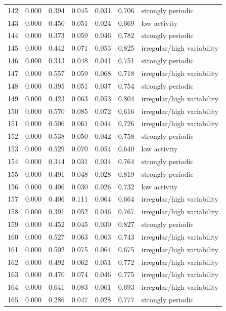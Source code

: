 \begin{longtable}{lrrrrrl}
142 & 0.000 & 0.394 & 0.045 & 0.031 & 0.706 & strongly periodic \\
143 & 0.000 & 0.450 & 0.051 & 0.024 & 0.669 & low activity \\
144 & 0.000 & 0.373 & 0.059 & 0.046 & 0.782 & strongly periodic \\
145 & 0.000 & 0.442 & 0.071 & 0.053 & 0.825 & irregular/high variability \\
146 & 0.000 & 0.313 & 0.048 & 0.041 & 0.751 & strongly periodic \\
147 & 0.000 & 0.557 & 0.059 & 0.068 & 0.718 & irregular/high variability \\
148 & 0.000 & 0.395 & 0.051 & 0.037 & 0.754 & strongly periodic \\
149 & 0.000 & 0.423 & 0.063 & 0.053 & 0.804 & irregular/high variability \\
150 & 0.000 & 0.570 & 0.085 & 0.072 & 0.616 & irregular/high variability \\
151 & 0.000 & 0.506 & 0.061 & 0.044 & 0.726 & irregular/high variability \\
152 & 0.000 & 0.538 & 0.050 & 0.042 & 0.758 & strongly periodic \\
153 & 0.000 & 0.529 & 0.070 & 0.054 & 0.640 & low activity \\
154 & 0.000 & 0.344 & 0.031 & 0.034 & 0.764 & strongly periodic \\
155 & 0.000 & 0.491 & 0.048 & 0.028 & 0.819 & strongly periodic \\
156 & 0.000 & 0.406 & 0.030 & 0.026 & 0.732 & low activity \\
157 & 0.000 & 0.406 & 0.111 & 0.064 & 0.664 & irregular/high variability \\
158 & 0.000 & 0.391 & 0.052 & 0.046 & 0.767 & irregular/high variability \\
159 & 0.000 & 0.452 & 0.045 & 0.030 & 0.827 & strongly periodic \\
160 & 0.000 & 0.527 & 0.063 & 0.063 & 0.743 & irregular/high variability \\
161 & 0.000 & 0.502 & 0.075 & 0.064 & 0.675 & irregular/high variability \\
162 & 0.000 & 0.492 & 0.062 & 0.051 & 0.772 & irregular/high variability \\
163 & 0.000 & 0.470 & 0.074 & 0.046 & 0.775 & irregular/high variability \\
164 & 0.000 & 0.641 & 0.083 & 0.061 & 0.693 & irregular/high variability \\
165 & 0.000 & 0.286 & 0.047 & 0.028 & 0.777 & strongly periodic \\

\end{longtable}
